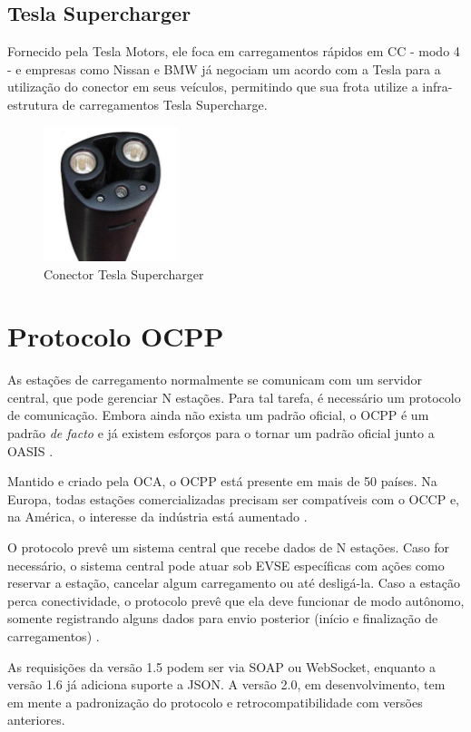       \subsection{Tesla Supercharger}

        Fornecido pela Tesla Motors, ele foca em carregamentos rápidos em \ac{CC} - modo 4 - e empresas como Nissan e BMW já negociam um acordo com a Tesla para a utilização do conector em seus veículos, permitindo que sua frota utilize a infra-estrutura de carregamentos Tesla Supercharge.

        \begin{figure}[H]
          \begin{center}
            \includegraphics[width=0.35\textwidth,natwidth=300,natheight=300]{assets/images/connectors-tesla.jpg}
            \caption{Conector Tesla Supercharger}
            \label{fig:tesla}
          \end{center}
        \end{figure}

  \section{Protocolo OCPP}

    As estações de carregamento normalmente se comunicam com um servidor central, que pode gerenciar N estações. Para tal tarefa, é necessário um protocolo de comunicação. Embora ainda não exista um padrão oficial, o \ac{OCPP} é um padrão \textit{de facto} e já existem esforços para o tornar um padrão oficial junto a \ac{OASIS} \cite{ocpp-news-standardization}.

    Mantido e criado pela \ac{OCA}, o OCPP está presente em mais de 50 países. Na Europa, todas estações comercializadas precisam ser compatíveis com o OCCP e, na América, o interesse da indústria está aumentado \cite{forbes-news-ocpp}.

    O protocolo prevê um sistema central que recebe dados de N estações. Caso for necessário, o sistema central pode atuar sob \ac{EVSE} específicas com ações como reservar a estação, cancelar algum carregamento ou até desligá-la. Caso a estação perca conectividade, o protocolo prevê que ela deve funcionar de modo autônomo, somente registrando alguns dados para envio posterior (início e finalização de carregamentos) \cite{ocpp-spec-15}.

    As requisições da versão 1.5 podem ser via SOAP ou WebSocket, enquanto a versão 1.6 já adiciona suporte a JSON. A versão 2.0, em desenvolvimento, tem em mente a padronização do protocolo e retrocompatibilidade com versões anteriores.
